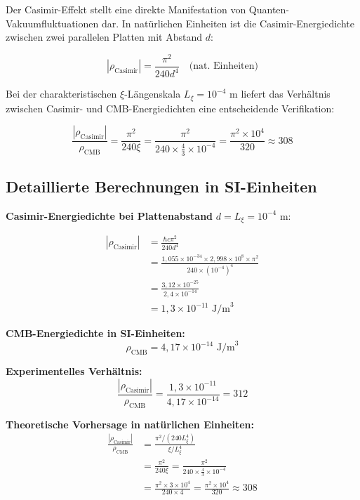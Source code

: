 \documentclass[12pt,a4paper]{article}
\theoremstyle{definition}
\theoremstyle{remark}
\begin{document}
	Der Casimir-Effekt stellt eine direkte Manifestation von Quanten-Vakuumfluktuationen dar. In nat\"urlichen Einheiten ist die Casimir-Energiedichte zwischen zwei parallelen Platten mit Abstand $d$:
	
	\begin{equation}
		|\rho_{\text{Casimir}}| = \frac{\pi^2}{240 d^4} \quad \text{(nat. Einheiten)}
	\end{equation}
	
	Bei der charakteristischen $\xi$-L\"angenskala $L_\xi = 10^{-4}$ m liefert das Verh\"altnis zwischen Casimir- und CMB-Energiedichten eine entscheidende Verifikation:
	
	\begin{equation}
		\frac{|\rho_{\text{Casimir}}|}{\rho_{\text{CMB}}} = \frac{\pi^2}{240 \xi} = \frac{\pi^2}{240 \times \frac{4}{3} \times 10^{-4}} = \frac{\pi^2 \times 10^4}{320} \approx 308
	\end{equation}
	
	\subsection{Detaillierte Berechnungen in SI-Einheiten}
	
	\textbf{Casimir-Energiedichte bei Plattenabstand} $d = L_\xi = 10^{-4}$ m:
	
	\begin{align}
		|\rho_{\text{Casimir}}| &= \frac{\hbar c \pi^2}{240 d^4} \\
		&= \frac{1,055 \times 10^{-34} \times 2,998 \times 10^8 \times \pi^2}{240 \times (10^{-4})^4} \\
		&= \frac{3,12 \times 10^{-25}}{2,4 \times 10^{-14}} \\
		&= 1,3 \times 10^{-11} \text{ J/m}^3
	\end{align}
	
	\textbf{CMB-Energiedichte in SI-Einheiten:}
	\begin{equation}
		\rho_{\text{CMB}} = 4,17 \times 10^{-14} \text{ J/m}^3
	\end{equation}
	
	\textbf{Experimentelles Verh\"altnis:}
	\begin{equation}
		\frac{|\rho_{\text{Casimir}}|}{\rho_{\text{CMB}}} = \frac{1,3 \times 10^{-11}}{4,17 \times 10^{-14}} = 312
	\end{equation}
	
	\textbf{Theoretische Vorhersage in nat\"urlichen Einheiten:}
	\begin{align}
		\frac{|\rho_{\text{Casimir}}|}{\rho_{\text{CMB}}} &= \frac{\pi^2 / (240 L_\xi^4)}{\xi / L_\xi^4} \\
		&= \frac{\pi^2}{240 \xi} = \frac{\pi^2}{240 \times \frac{4}{3} \times 10^{-4}} \\
		&= \frac{\pi^2 \times 3 \times 10^4}{240 \times 4} = \frac{\pi^2 \times 10^4}{320} \approx 308
	\end{align}
	
\end{document}

